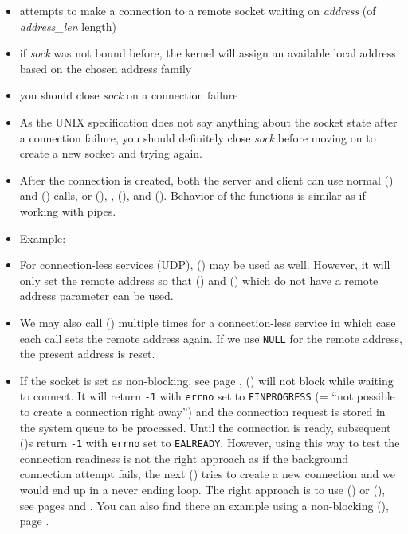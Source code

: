 
\begin{slide}
\begin{itemize}
\item attempts to make a connection to a remote socket waiting on \emph{address}
(of \emph{address\_len} length) 
\item if \emph{sock} was not bound before, the kernel will assign an available
local address based on the chosen address family
\item you should close \emph{sock} on a connection failure
\end{itemize}
\end{slide}

\label{CONNECT}

\begin{itemize}
\item As the UNIX specification does not say anything about the socket state
after a connection failure, you should definitely close \emph{sock} before
moving on to create a new socket and trying again.
\item After the connection is created, both the server and client can use normal
() and () calls, or (), ,
(), and ().  Behavior of the functions is similar
as if working with pipes.
\item Example: \label{CONNECT_C} 
\item \label{CONNECT_FOR_UDP} For connection-less services (UDP),
() may be used as well.  However, it will only set the remote
address so that () and () which do not have a remote
address parameter can be used.
\item We may also call () multiple times for a connection-less
service in which case each call sets the remote address again.  If we use
\texttt{NULL} for the remote address, the present address is reset.
\item If the socket is set as non-blocking, see page \pageref{FCNTL},
() will not block while waiting to connect.  It will return
\texttt{-1} with \texttt{errno} set to \texttt{EINPROGRESS} (= ``not possible to
create a connection right away'') and the connection request is stored in the
system queue to be processed.  Until the connection is ready, subsequent
()s return \texttt{-1} with \texttt{errno} set to
\texttt{EALREADY}.  However, using this way to test the connection readiness is
not the right approach as if the background connection attempt fails, the next
() tries to create a new connection and we would end up in a
never ending loop.  The right approach is to use () or
(), see pages \pageref{SELECT} and \pageref{POLL}.  You can also
find there an example using a non-blocking (), page
\pageref{NON_BLOCKING_CONNECT}.
\end{itemize}

